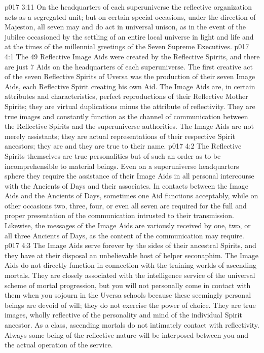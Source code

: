 \vs p017 3:11 On the headquarters of each superuniverse the reflective organization acts as a segregated unit; but on certain special occasions, under the direction of Majeston, all seven may and do act in universal unison, as in the event of the jubilee occasioned by the settling of an entire local universe in light and life and at the times of the millennial greetings of the Seven Supreme Executives.
\vs p017 4:1 The 49 Reflective Image Aids were created by the Reflective Spirits, and there are just 7 Aids on the headquarters of each superuniverse. The first creative act of the seven Reflective Spirits of Uversa was the production of their seven Image Aids, each Reflective Spirit creating his own Aid. The Image Aids are, in certain attributes and characteristics, perfect reproductions of their Reflective Mother Spirits; they are virtual duplications minus the attribute of reflectivity. They are true images and constantly function as the channel of communication between the Reflective Spirits and the superuniverse authorities. The Image Aids are not merely assistants; they are actual representations of their respective Spirit ancestors; they are  and they are true to their name.
\vs p017 4:2 The Reflective Spirits themselves are true personalities but of such an order as to be incomprehensible to material beings. Even on a superuniverse headquarters sphere they require the assistance of their Image Aids in all personal intercourse with the Ancients of Days and their associates. In contacts between the Image Aids and the Ancients of Days, sometimes one Aid functions acceptably, while on other occasions two, three, four, or even all seven are required for the full and proper presentation of the communication intrusted to their transmission. Likewise, the messages of the Image Aids are variously received by one, two, or all three Ancients of Days, as the content of the communication may require.
\vs p017 4:3 The Image Aids serve forever by the sides of their ancestral Spirits, and they have at their disposal an unbelievable host of helper seconaphim. The Image Aids do not directly function in connection with the training worlds of ascending mortals. They are closely associated with the intelligence service of the universal scheme of mortal progression, but you will not personally come in contact with them when you sojourn in the Uversa schools because these seemingly personal beings are devoid of will; they do not exercise the power of choice. They are true images, wholly reflective of the personality and mind of the individual Spirit ancestor. As a class, ascending mortals do not intimately contact with reflectivity. Always some being of the reflective nature will be interposed between you and the actual operation of the service.

